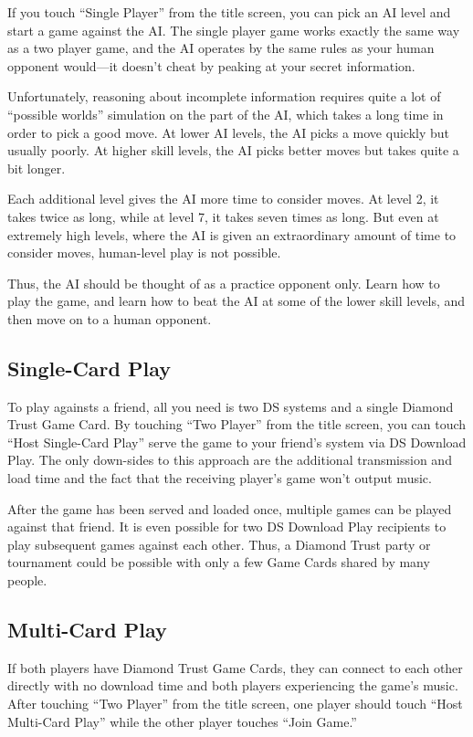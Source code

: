 \documentclass[8pt]{extbook}
\begin{document}
If you touch ``Single Player'' from the title screen, you can pick an AI level and start a game against the AI.  The single player game works exactly the same way as a two player game, and the AI operates by the same rules as your human opponent would---it doesn't cheat by peaking at your secret information.

Unfortunately, reasoning about incomplete information requires quite a lot of ``possible worlds'' simulation on the part of the AI, which takes a long time in order to pick a good move.  At lower AI levels, the AI picks a move quickly but usually poorly.  At higher skill levels, the AI picks better moves but takes quite a bit longer.

Each additional level gives the AI more time to consider moves.  At level 2, it takes twice as long, while at level 7, it takes seven times as long.  But even at extremely high levels, where the AI is given an extraordinary amount of time to consider moves, human-level play is not possible.

Thus, the AI should be thought of as a practice opponent only.  Learn how to play the game, and learn how to beat the AI at some of the lower skill levels, and then move on to a human opponent.  

\subsection{Single-Card Play}
To play againsts a friend, all you need is two DS systems and a single Diamond Trust Game Card.  By touching ``Two Player'' from the title screen, you can touch ``Host Single-Card Play'' serve the game to your friend's system via DS Download Play.  The only down-sides to this approach are the additional transmission and load time and the fact that the receiving player's game won't output music.

After the game has been served and loaded once, multiple games can be played against that friend.  It is even possible for two DS Download Play recipients to play subsequent games against each other.  Thus, a Diamond Trust party or tournament could be possible with only a few Game Cards shared by many people. 

\subsection{Multi-Card Play}
If both players have Diamond Trust Game Cards, they can connect to each other directly with no download time and both players experiencing the game's music.  After touching ``Two Player'' from the title screen, one player should touch ``Host Multi-Card Play'' while the other player touches ``Join Game.''
\end{document}
